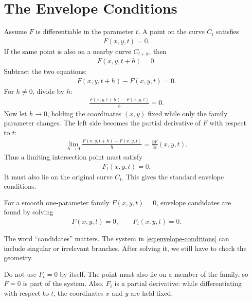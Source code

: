 \documentclass[11pt]{article}
\begin{document}
\section{The Envelope Conditions}

Assume \(F\) is differentiable in the parameter \(t\). A point on the curve \(C_t\) satisfies
\begin{align}
  F(x,y,t)=0.
\end{align}
If the same point is also on a nearby curve \(C_{t+h}\), then
\begin{align}
  F(x,y,t+h)=0.
\end{align}
Subtract the two equations:
\begin{align}
  F(x,y,t+h)-F(x,y,t)=0.
\end{align}
For \(h\neq 0\), divide by \(h\):
\begin{align}
  \frac{F(x,y,t+h)-F(x,y,t)}{h}=0.
\end{align}
Now let \(h\to 0\), holding the coordinates \((x,y)\) fixed while only the family parameter changes. The left side becomes the partial derivative of \(F\) with respect to \(t\):
\begin{align}
  \lim_{h\to0}
  \frac{F(x,y,t+h)-F(x,y,t)}{h}
  =
  \frac{\partial F}{\partial t}(x,y,t).
\end{align}
Thus a limiting intersection point must satisfy
\begin{align}
  F_t(x,y,t)=0.
\end{align}
It must also lie on the original curve \(C_t\). This gives the standard envelope conditions.

\begin{resultbox}
For a smooth one-parameter family \(F(x,y,t)=0\), envelope candidates are found by solving
\begin{align}
  \boxed{F(x,y,t)=0,\qquad F_t(x,y,t)=0.}
  \label{eq:envelope-conditions}
\end{align}
\end{resultbox}

The word ``candidates'' matters. The system in \cref{eq:envelope-conditions} can include singular or irrelevant branches. After solving it, we still have to check the geometry.

\begin{warningbox}[title=Two common mistakes]
Do not use \(F_t=0\) by itself. The point must also lie on a member of the family, so \(F=0\) is part of the system. Also, \(F_t\) is a partial derivative: while differentiating with respect to \(t\), the coordinates \(x\) and \(y\) are held fixed.
\end{warningbox}
\end{document}
